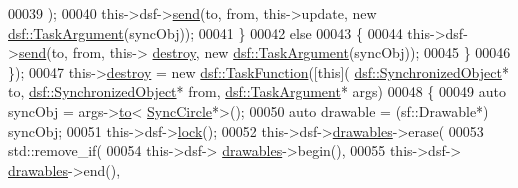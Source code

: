 \begin{DoxyCode}
00039                                                                       );
00040                                                  this->dsf->\hyperlink{classdsf_1_1_dual_state_framework_a3063d7f0ce537eb44dc2bdcec816a36b}{send}(to, from, this->update, \textcolor{keyword}{new} 
      \hyperlink{classyc_1_1_any}{dsf::TaskArgument}(syncObj));
00041                                              \}
00042                                              \textcolor{keywordflow}{else}
00043                                              \{
00044                                                  this->dsf->\hyperlink{classdsf_1_1_dual_state_framework_a3063d7f0ce537eb44dc2bdcec816a36b}{send}(to, from, this->
      \hyperlink{class_random_circle_manager_af87d7d788cd9c4a1a37a30ad959cc445}{destroy}, \textcolor{keyword}{new} \hyperlink{classyc_1_1_any}{dsf::TaskArgument}(syncObj));
00045                                              \}
00046                                          \});
00047     this->\hyperlink{class_random_circle_manager_af87d7d788cd9c4a1a37a30ad959cc445}{destroy} = \textcolor{keyword}{new} \hyperlink{namespacedsf_aa16e735f29587f4485b56fc46746f7a9}{dsf::TaskFunction}([\textcolor{keyword}{this}](
      \hyperlink{classdsf_1_1_synchronized_object}{dsf::SynchronizedObject}* to, \hyperlink{classdsf_1_1_synchronized_object}{dsf::SynchronizedObject}* from, 
      \hyperlink{classyc_1_1_any}{dsf::TaskArgument}* args)
00048                                           \{
00049                                               \textcolor{keyword}{auto} syncObj = args->\hyperlink{classyc_1_1_any_a3db663604505ef8d7e84dd41d5bfcc75}{to}<
      \hyperlink{class_sync_circle}{SyncCircle}*>();
00050                                               \textcolor{keyword}{auto} drawable = (sf::Drawable*) syncObj;
00051                                               this->dsf->\hyperlink{classdsf_1_1_lock_ae521388d861fe66b9c6e2f09811b0d4b}{lock}();
00052                                               this->dsf->\hyperlink{classdsf_1_1sfml_1_1_render_window_a745350dfdb1f752359f9055d714c453d}{drawables}->erase(
00053                                                                           std::remove\_if(
00054                                                                                          this->dsf->
      \hyperlink{classdsf_1_1sfml_1_1_render_window_a745350dfdb1f752359f9055d714c453d}{drawables}->begin(),
00055                                                                                          this->dsf->
      \hyperlink{classdsf_1_1sfml_1_1_render_window_a745350dfdb1f752359f9055d714c453d}{drawables}->end(),

\end{DoxyCode}
